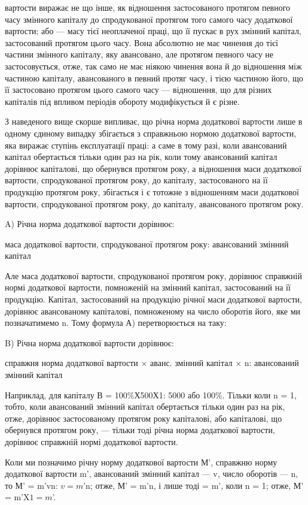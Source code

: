 \parcont{}  %
вартости виражає не що інше, як відношення застосованого протягом
певного часу змінного капіталу до спродукованої протягом того самого
часу додаткової вартости; або — масу тієї неоплаченої праці, що її пускає
в рух змінний капітал, застосований протягом цього часу. Вона абсолютно
не має чинення до тієї частини змінного капіталу, яку авансовано,
але протягом певного часу не застосовується, отже, так само не
має ніякою чинення вона й до відношення між частиною капіталу, авансованого
в певний протяг часу, і тією частиною його, що її застосовано
протягом цього самого часу — відношення, що для різних капіталів
під впливом періодів обороту модифікується й є різне.

З наведеного вище скорше випливає, що річна норма додаткової вартости
лише в одному єдиному випадку збігається з справжньою нормою
додаткової вартости, яка виражає ступінь експлуатації праці: а саме в
тому разі, коли авансований капітал обертається тільки один раз на рік,
коли тому авансований капітал дорівнює капіталові, що обернувся протягом
року, а відношення маси додаткової вартости, спродукованої протягом
року, до капіталу, застосованого на її продукцію протягом року, збігається
і є тотожне з відношенням маси додаткової вартости, спродукованої
протягом року, до капіталу, авансованого протягом року.

A) Річна норма додаткової вартости дорівнює:

маса додаткової вартости, спродукованої протягом року: авансований змінний капітал

Але маса додаткової вартости, спродукованої протягом року, дорівнює
справжній нормі додаткової вартости, помноженій на змінний капітал,
застосований на її продукцію. Капітал, застосований на продукцію
річної маси додаткової вартости, дорівнює авансованому капіталові, помноженому
на число оборотів його, яке ми позначатимемо n. Тому формула А) перетворюється на таку:

B) Річна норма додаткової вартости дорівнює:

справжня норма додаткової вартости × аванс. змінний капітал × n: авансований змінний капітал

Наприклад, для капіталу В = 100\%Х500Х1: 5000 або 100\%. Тільки коли
n = 1, тобто, коли авансований змінний капітал обертається тільки
один раз на рік, отже, дорівнює застосованому протягом року капіталові,
або капіталові, що обернувся протягом року, — тільки тоді річна норма додаткової
вартости, дорівнює справжній нормі додаткової вартости.

Коли ми позначимо річну норму додаткової вартости М', справжню норму
додаткової вартости m', авансований змінний капітал — v, число оборотів
— n, то М' = m'vn: $v = m$'n; отже, М' = m'n, і лише тоді = m', коли
n = 1; отже, М' = m'X$1 = m$'.
\parbreak{}  %
